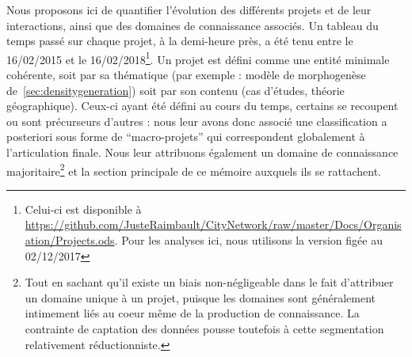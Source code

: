 Nous proposons ici de quantifier l'évolution des différents projets et de leur interactions, ainsi que des domaines de connaissance associés. Un tableau du temps passé sur chaque projet, à la demi-heure près, a été tenu entre le 16/02/2015 et le 16/02/2018\footnote{Celui-ci est disponible à \url{https://github.com/JusteRaimbault/CityNetwork/raw/master/Docs/Organisation/Projects.ods}. Pour les analyses ici, nous utilisons la version figée au 02/12/2017}. Un projet est défini comme une entité minimale cohérente, soit par sa thématique (par exemple : modèle de morphogenèse de~\ref{sec:densitygeneration}) soit par son contenu (cas d'études, théorie géographique). Ceux-ci ayant été défini au cours du temps, certains se recoupent ou sont précurseurs d'autres : nous leur avons donc associé une classification a posteriori sous forme de ``macro-projets'' qui correspondent globalement à l'articulation finale. Nous leur attribuons également un domaine de connaissance majoritaire\footnote{Tout en sachant qu'il existe un biais non-négligeable dans le fait d'attribuer un domaine unique à un projet, puisque les domaines sont généralement intimement liés au coeur même de la production de connaissance. La contrainte de captation des données pousse toutefois à cette segmentation relativement réductionniste.} et la section principale de ce mémoire auxquels ils se rattachent.


